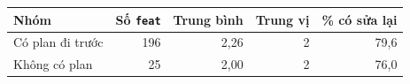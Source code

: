 \begin{tabular}{lrrrr}
\toprule
Nhóm & Số \texttt{feat} & Trung bình & Trung vị & \% có sửa lại \\
\midrule
Có plan đi trước & 196 & 2,26 & 2 & 79,6 \\
Không có plan & 25 & 2,00 & 2 & 76,0 \\
\bottomrule
\end{tabular}
